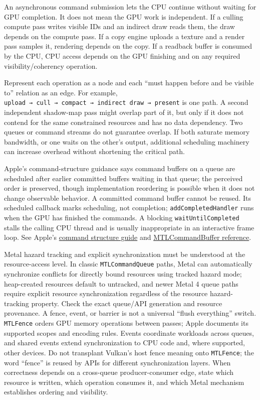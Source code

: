 An asynchronous command submission lets the CPU continue without waiting for GPU completion. It does not mean the GPU work is independent. If a culling compute pass writes visible IDs and an indirect draw reads them, the draw depends on the compute pass. If a copy engine uploads a texture and a render pass samples it, rendering depends on the copy. If a readback buffer is consumed by the CPU, CPU access depends on the GPU finishing and on any required visibility/coherency operation.

Represent each operation as a node and each ``must happen before and be visible to'' relation as an edge. For example, \texttt{upload\ →\ cull\ →\ compact\ →\ indirect\ draw\ →\ present} is one path. A second independent shadow-map pass might overlap part of it, but only if it does not contend for the same constrained resources and has no data dependency. Two queues or command streams do not guarantee overlap. If both saturate memory bandwidth, or one waits on the other's output, additional scheduling machinery can increase overhead without shortening the critical path.

Apple's command-structure guidance says command buffers on a queue are scheduled after earlier committed buffers waiting in that queue; the perceived order is preserved, though implementation reordering is possible when it does not change observable behavior. A committed command buffer cannot be reused. Its scheduled callback marks scheduling, not completion; \texttt{addCompletedHandler} runs when the GPU has finished the commands. A blocking \texttt{waitUntilCompleted} stalls the calling CPU thread and is usually inappropriate in an interactive frame loop. See Apple's \href{https://developer.apple.com/documentation/Metal/setting-up-a-command-structure}{command structure guide} and \href{https://developer.apple.com/documentation/metal/mtlcommandbuffer}{MTLCommandBuffer reference}.

Metal hazard tracking and explicit synchronization must be understood at the resource-access level. In classic \texttt{MTLCommandQueue} paths, Metal can automatically synchronize conflicts for directly bound resources using tracked hazard mode; heap-created resources default to untracked, and newer Metal 4 queue paths require explicit resource synchronization regardless of the resource hazard-tracking property. Check the exact queue/API generation and resource provenance. A fence, event, or barrier is not a universal ``flush everything'' switch. \texttt{MTLFence} orders GPU memory operations between passes; Apple documents its supported scopes and encoding rules. Events coordinate workloads across queues, and shared events extend synchronization to CPU code and, where supported, other devices. Do not transplant Vulkan's host fence meaning onto \texttt{MTLFence}; the word ``fence'' is reused by APIs for different synchronization layers. When correctness depends on a cross-queue producer-consumer edge, state which resource is written, which operation consumes it, and which Metal mechanism establishes ordering and visibility.

